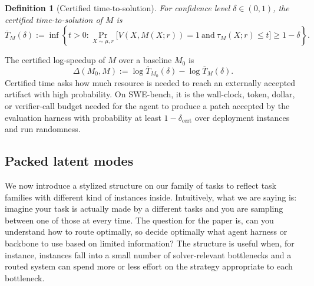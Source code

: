 \documentclass{article}
\newtheorem{definition}{Definition}
\begin{document}
\begin{definition}[Certified time-to-solution]
\label{def:certified-time}
For confidence level \(\delta\in(0,1)\), the certified time-to-solution
of \(M\) is
\[
    \overline T_M(\delta)
    :=
    \inf\left\{
        t>0:
        \Pr_{X\sim\mu,r}
        \big[
            V(X,M(X;r))=1
            \ \mathrm{and}\
            \tau_M(X;r)\le t
        \big]
        \ge 1-\delta
    \right\}.
\]
\end{definition}
The certified log-speedup of \(M\) over a baseline \(M_0\) is
\[
    \Delta(M_0,M)
    :=
    \log \overline T_{M_0}(\delta)
    -
    \log \overline T_M(\delta).
\]
Certified time asks how much resource is needed to reach an externally accepted artifact with high probability.
On SWE-bench, it is the wall-clock, token, dollar, or verifier-call budget needed for the agent to produce a patch accepted by the evaluation harness with probability at least \(1-\delta_{\mathrm{cert}}\) over deployment instances and run randomness.


\subsection{Packed latent modes}
\label{subsec:packed-latent-modes}

We now introduce a stylized structure on our family of tasks to reflect task families with different kind of instances inside. Intuitively, what we are saying is: imagine your task is actually made by a different tasks and you are sampling between one of those at every time.
The question for the paper is, can you understand how to route optimally, so decide optimally what agent harness or backbone to use based on limited information?
The structure is useful when, for instance, instances fall into a small number of solver-relevant bottlenecks and a routed system can spend more or less effort on the strategy appropriate to each bottleneck.
\end{document}
